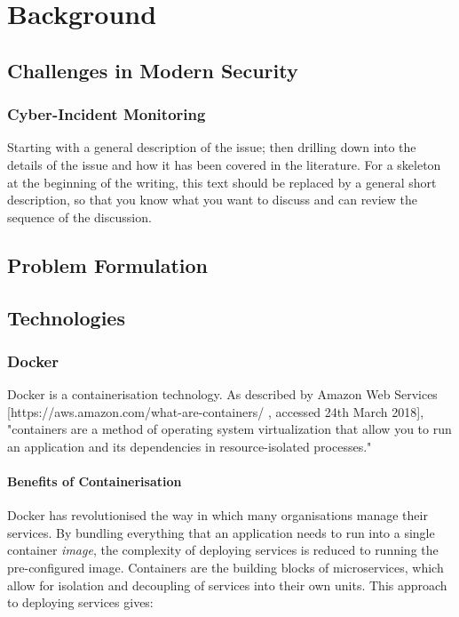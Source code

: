 \chapter{Background}

\section{Challenges in Modern Security}

\subsection{Cyber-Incident Monitoring}

Starting with a general description of the issue; then drilling down into the details of the issue and how it has been covered in the literature. For a skeleton at the beginning of the writing, this text should be replaced by a general short description, so that you know what you want to discuss and can review the sequence of the discussion.



\section{Problem Formulation}

\section{Technologies}
\subsection{Docker}

Docker is a containerisation technology. As described by Amazon Web Services [https://aws.amazon.com/what-are-containers/ , accessed 24th March 2018], "containers are a method of operating system virtualization that allow you to run an application and its dependencies in resource-isolated processes."

\subsubsection{Benefits of Containerisation}

Docker has revolutionised the way in which many organisations manage their services. By bundling everything that an application needs to run into a single container \textit{image}, the complexity of deploying services is reduced to running the pre-configured image. Containers are the building blocks of microservices, which allow for isolation and decoupling of services into their own units. This approach to deploying services gives:


